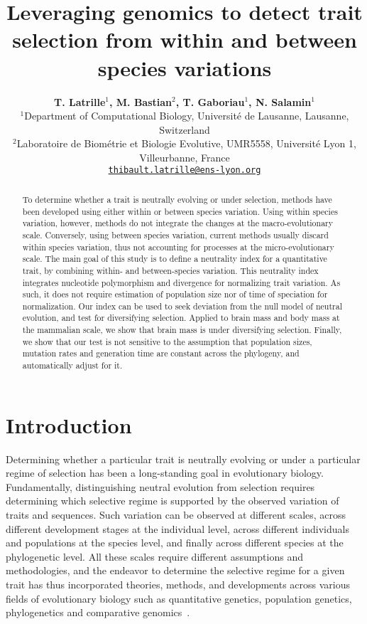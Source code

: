 \documentclass{article}
\title{Leveraging genomics to detect trait selection from within and between species variations}
\author{
\large
\textbf{T. {Latrille}$^{1}$\orcidlink{0000-0002-9643-4668}, M. {Bastian}$^{2}$, T. {Gaboriau}$^{1}$\orcidlink{0000-0001-7530-2204}, N. {Salamin}$^{1}$\orcidlink{0000-0002-3963-4954}}\\
\normalsize
$^{1}$Department of Computational Biology, Université de Lausanne, Lausanne, Switzerland\\
$^{2}$Laboratoire de Biométrie et Biologie Evolutive, UMR5558, Université Lyon 1, Villeurbanne, France \\
\texttt{\href{mailto:thibault.latrille@ens-lyon.org}{thibault.latrille@ens-lyon.org}} \\
}
\begin{document}
\maketitle

\begin{abstract}
    To determine whether a trait is neutrally evolving or under selection, methods have been developed using either within or between species variation.
    Using within species variation, however, methods do not integrate the changes at the macro-evolutionary scale.
    Conversely, using between species variation, current methods usually discard within species variation, thus not accounting for processes at the micro-evolutionary scale.
    The main goal of this study is to define a neutrality index for a quantitative trait, by combining within- and between-species variation.
    This neutrality index integrates nucleotide polymorphism and divergence for normalizing trait variation.
    As such, it does not require estimation of population size nor of time of speciation for normalization.
    Our index can be used to seek deviation from the null model of neutral evolution, and test for diversifying selection.
    Applied to brain mass and body mass at the mammalian scale, we show that brain mass is under diversifying selection.
    Finally, we show that our test is not sensitive to the assumption that population sizes, mutation rates and generation time are constant across the phylogeny, and automatically adjust for it.
\end{abstract}


\section*{Introduction}\label{sec:introduction}

Determining whether a particular trait is neutrally evolving or under a particular regime of selection has been a long-standing goal in evolutionary biology.
Fundamentally, distinguishing neutral evolution from selection requires determining which selective regime is supported by the observed variation of traits and sequences.
Such variation can be observed at different scales, across different development stages at the individual level, across different individuals and populations at the species level, and finally across different species at the phylogenetic level.
All these scales require different assumptions and methodologies, and the endeavor to determine the selective regime for a given trait has thus incorporated theories, methods, and developments across various fields of evolutionary biology such as quantitative genetics, population genetics, phylogenetics and comparative genomics~\cite{lynch_genetics_1998, walsh_evolution_2018}.
\end{document}
